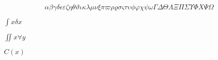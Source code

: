 \documentclass{article}
\begin{document}
\begin{equation}
  αβγδϵεζηθϑικλμνξπϖρϱσςτυϕφχψωΓΔΘΛΞΠΣΥΦΧΨΩ
\end{equation}

$\int x \delta x$

$∬ x ∀ y$

$C(x)$
\end{document}
